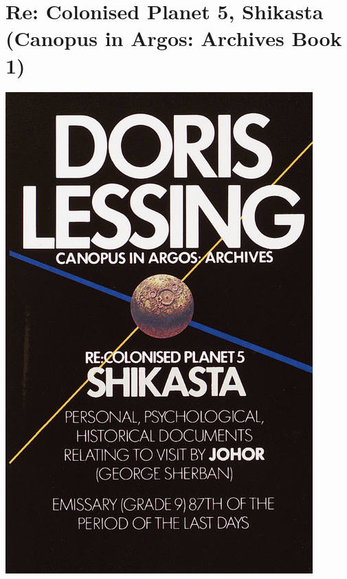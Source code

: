 \documentclass{tufte-handout}
\makeatletter
\newcommand{\varcaption}[2][0pt]{%
  \gsetlength{\@tufte@caption@vertical@offset}{-#1}%
  \gdef\@tufte@stored@varcaption{#2}%
}
\gdef\@tufte@stored@varcaption{} %
\makeatother
\begin{document}
\section*{Re: Colonised Planet 5, Shikasta (Canopus in Argos: \newline Archives Book 1)}
\begin{marginfigure}[\baselineskip]
   \includegraphics[width=\linewidth]{images/shikasta.jpg}
   \varcaption{\href{https://www.penguinrandomhouse.com/books/100291/shikasta-by-doris-lessing/9780394749778/}{Publisher Link}, \href{https://www.amazon.com/Shikasta-Colonised-Planet-Vintage-International/dp/0394749774/}{Amazon Link}}
\end{marginfigure}
\end{document}
